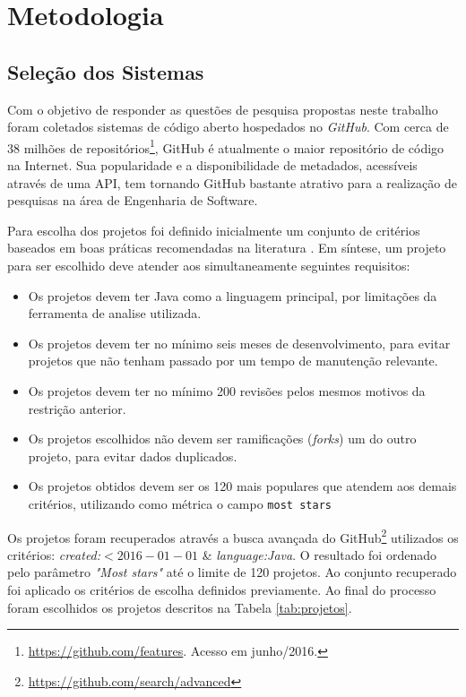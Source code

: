 \documentclass[12pt]{article}
\begin{document}
\section{Metodologia}
\label{sec:metodologia}


\subsection{Seleção dos Sistemas}
\label{subsec:selecao_sistemas}

Com o objetivo de responder as questões de pesquisa propostas neste trabalho foram coletados sistemas de código aberto hospedados no \textsl{GitHub}. Com cerca de 38 milhões de repositórios\footnote{\url{https://github.com/features}. Acesso em junho/2016.}, GitHub é atualmente o maior repositório de código na Internet. Sua popularidade e a disponibilidade de metadados, acessíveis através de uma API, tem tornando GitHub bastante atrativo para a realização de pesquisas na área de Engenharia de Software. 

Para escolha dos projetos foi definido inicialmente um conjunto de critérios baseados em boas práticas recomendadas na literatura \cite{Bird2009}. Em síntese, um projeto para ser escolhido deve atender aos simultaneamente seguintes requisitos:

\begin{itemize}
	\item Os projetos devem ter Java como a linguagem principal, por limitações da
ferramenta de analise utilizada.
\\
	\item Os projetos devem ter no mínimo seis meses de desenvolvimento, para evitar projetos que não 
tenham passado por um tempo de manutenção relevante.
\\
\item Os  projetos  devem  ter  no  mínimo  200  revisões  pelos  mesmos  motivos  da
restrição anterior.
\\
\item Os projetos escolhidos não devem ser ramificações (\textsl{forks}) um do outro projeto, para evitar dados duplicados.

\item Os projetos obtidos devem ser os 120 mais populares que atendem aos demais critérios, utilizando como métrica o campo \texttt{most stars}
\end{itemize}

Os projetos foram recuperados através a busca avançada do GitHub\footnote{\url{https://github.com/search/advanced}} utilizados os critérios:  \textsl{created:}$<2016-01-01$ \& \textsl{language:Java}. O resultado foi ordenado pelo parâmetro \textsl{"Most stars"} até o limite de 120 projetos. Ao conjunto recuperado foi aplicado os critérios de escolha definidos previamente. Ao final do processo foram escolhidos os projetos descritos na Tabela \ref{tab:projetos}. 
\end{document}
